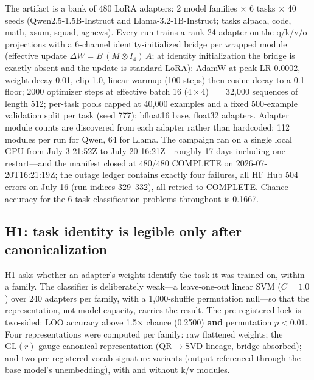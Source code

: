 \documentclass[10pt]{article}
\begin{document}
The artifact is a bank of 480 LoRA adapters: 2 model families $\times$ 6
tasks $\times$ 40 seeds (Qwen2.5-1.5B-Instruct and Llama-3.2-1B-Instruct;
tasks alpaca, code, math, xsum, squad, agnews). Every run trains a rank-24
adapter on the q/k/v/o projections with a 6-channel identity-initialized
bridge per wrapped module (effective update $\Delta W = B\,(M \otimes
I_4)\,A$; at identity initialization the bridge is exactly absent and the
update is standard LoRA): AdamW at peak LR 0.0002, weight decay 0.01, clip
1.0, linear warmup (100 steps) then cosine decay to a 0.1 floor; 2000
optimizer steps at effective batch 16 ($4 \times 4$) $=$ 32{,}000
sequences of length 512; per-task pools capped at 40{,}000 examples and a
fixed 500-example validation split per task (seed 777); bfloat16 base,
float32 adapters. Adapter module counts are discovered from each adapter
rather than hardcoded: 112 modules per run for Qwen, 64 for Llama. The
campaign ran on a single local GPU from July 3 21:52Z to July 20
16:21Z---roughly 17 days including one restart---and the manifest closed at
480/480 COMPLETE on 2026-07-20T16:21:19Z; the outage ledger contains
exactly four failures, all HF Hub 504 errors on July 16 (run indices
329--332), all retried to COMPLETE. Chance accuracy for the 6-task
classification problems throughout is 0.1667.

\subsection{H1: task identity is legible only after canonicalization}
\label{sec:h1}

H1 asks whether an adapter's weights identify the task it was trained on,
within a family. The classifier is deliberately weak---a leave-one-out
linear SVM ($C = 1.0$) over 240 adapters per family, with a 1{,}000-shuffle
permutation null---so that the representation, not model capacity, carries
the result. The pre-registered lock is two-sided: LOO accuracy above
1.5$\times$ chance (0.2500) \textbf{and} permutation $p < 0.01$. Four
representations were computed per family: raw flattened weights; the
$\mathrm{GL}(r)$-gauge-canonical representation (QR$\rightarrow$SVD
lineage, bridge absorbed); and two pre-registered vocab-signature variants
(output-referenced through the base model's unembedding), with and without
k/v modules.
\end{document}
